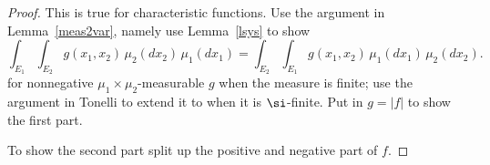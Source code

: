 \begin{proof}
This is true for characteristic functions. Use the argument in Lemma~\ref{meas2var}, namely use Lemma~\ref{lsys}
to show
\[
\int_{E_1}{\int_{E_2}g(x_1,x_2)\,\mu_2(dx_2)}\,\mu_1(dx_1)
=
\int_{E_2}{\int_{E_1}g(x_1,x_2)\,\mu_1(dx_1)}\,\mu_2(dx_2).
\]
for nonnegative $\mu_1\times \mu_2$-measurable $g$ when the measure is finite; use the argument in Tonelli to extend it to when it is $\si$-finite. Put in $g=|f|$ to show the first part. 

To show the second part split up the positive and negative part of $f$.
\end{proof}
%
